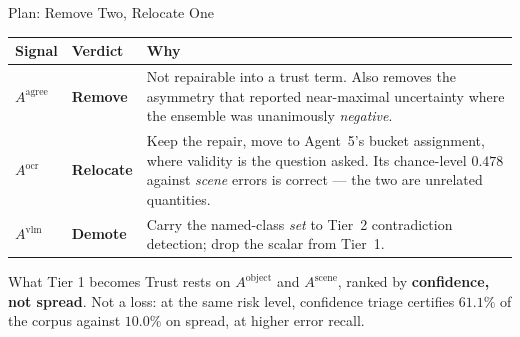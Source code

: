 \documentclass[aspectratio=169,11pt]{beamer}
\begin{document}
\begin{frame}{Plan: Remove Two, Relocate One}
\small
\begin{center}
\scriptsize
\begin{tabular}{@{}l l p{5.6cm}@{}}
\toprule
\textbf{Signal} & \textbf{Verdict} & \textbf{Why} \\
\midrule
$A^{\text{agree}}$ & \textbf{Remove} & Not repairable into a trust term. Also removes the asymmetry that reported near-maximal uncertainty where the ensemble was unanimously \emph{negative}. \\
\addlinespace
$A^{\text{ocr}}$ & \textbf{Relocate} & Keep the repair, move to Agent~5's bucket assignment, where validity is the question asked. Its chance-level $0.478$ against \emph{scene} errors is correct --- the two are unrelated quantities. \\
\addlinespace
$A^{\text{vlm}}$ & \textbf{Demote} & Carry the named-class \emph{set} to Tier~2 contradiction detection; drop the scalar from Tier~1. \\
\bottomrule
\end{tabular}
\end{center}
\vspace{1mm}
\begin{exampleblock}{\small What Tier 1 becomes}
\footnotesize Trust rests on $A^{\text{object}}$ and $A^{\text{scene}}$, ranked by \textbf{confidence, not spread}. Not a loss: at the same risk level, confidence triage certifies $\mathbf{61.1\%}$ of the corpus against $\mathbf{10.0\%}$ on spread, at higher error recall.
\end{exampleblock}
\end{frame}
\end{document}
